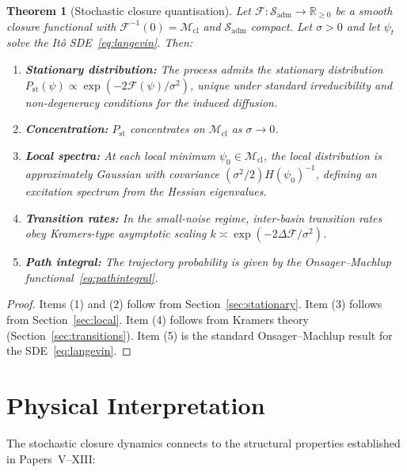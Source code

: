 \documentclass[12pt]{article}
\newtheorem{theorem}{Theorem}
\newcommand{\Mcl}{\mathcal{M}_{\mathrm{cl}}}
\newcommand{\Fcal}{\mathcal{F}}
\newcommand{\Sadm}{\mathcal{S}_{\mathrm{adm}}}
\begin{document}
\begin{theorem}[Stochastic closure quantisation]\label{thm:main}
Let $\Fcal : \Sadm \to \mathbb{R}_{\geq 0}$ be a smooth closure functional with $\Fcal^{-1}(0) = \Mcl$ and $\Sadm$ compact. Let $\sigma > 0$ and let $\psi_t$ solve the It\^o SDE~\eqref{eq:langevin}. Then:
\begin{enumerate}
    \item \textbf{Stationary distribution:} The process admits the stationary distribution $P_{\mathrm{st}}(\psi) \propto \exp(-2\Fcal(\psi)/\sigma^2)$, unique under standard irreducibility and non-degeneracy conditions for the induced diffusion.
    \item \textbf{Concentration:} $P_{\mathrm{st}}$ concentrates on $\Mcl$ as $\sigma \to 0$.
    \item \textbf{Local spectra:} At each local minimum $\psi_0 \in \Mcl$, the local distribution is approximately Gaussian with covariance $(\sigma^2/2)H(\psi_0)^{-1}$, defining an excitation spectrum from the Hessian eigenvalues.
    \item \textbf{Transition rates:} In the small-noise regime, inter-basin transition rates obey Kramers-type asymptotic scaling $k \asymp \exp(-2\Delta\Fcal/\sigma^2)$.
    \item \textbf{Path integral:} The trajectory probability is given by the Onsager--Machlup functional~\eqref{eq:pathintegral}.
\end{enumerate}
\end{theorem}

\begin{proof}
Items (1) and (2) follow from Section~\ref{sec:stationary}. Item (3) follows from Section~\ref{sec:local}. Item (4) follows from Kramers theory (Section~\ref{sec:transitions}). Item (5) is the standard Onsager--Machlup result for the SDE~\eqref{eq:langevin}.
\end{proof}

\section{Physical Interpretation}\label{sec:physics}

The stochastic closure dynamics connects to the structural properties established in Papers~V--XIII:
\end{document}
